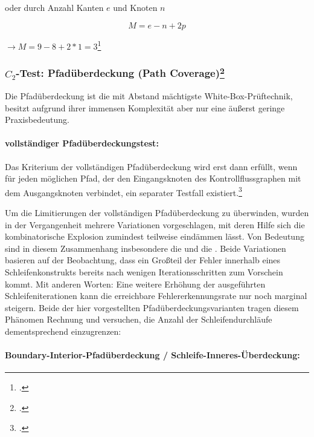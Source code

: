 \documentclass{lehramt-informatik}
\begin{document}
\noindent
oder durch Anzahl Kanten $e$ und Knoten $n$

\begin{displaymath}
M = e - n + 2p
\end{displaymath}

$\rightarrow M = 9 - 8 + 2 *1 = 3$\footcite[Kapitel 4.4.6
McCabe-Überdeckung, Seite 216220]{hoffmann}

%

\subsubsection{$C_2$-Test: Pfadüberdeckung (Path Coverage)\footcite[Seite 39]{sosy:fs:5}}

Die Pfadüberdeckung ist die mit Abstand mächtigste
White-Box-Prüftechnik, besitzt aufgrund ihrer immensen Komplexität
aber nur eine äußerst geringe Praxisbedeutung.

\paragraph{vollständiger Pfadüberdeckungstest:}

Das Kriterium der vollständigen Pfadüberdeckung wird erst dann erfüllt,
wenn für jeden möglichen Pfad, der den Eingangsknoten des
Kontrollflussgraphen mit dem Ausgangsknoten verbindet, ein separater
Testfall existiert.\footcite[Seite 210]{hoffmann}

Um die Limitierungen der vollständigen Pfadüberdeckung zu überwinden,
wurden in der Vergangenheit mehrere Variationen vorgeschlagen, mit deren
Hilfe sich die kombinatorische Explosion zumindest teilweise eindämmen
lässt. Von Bedeutung sind in diesem Zusammenhang insbesondere die
 und die . Beide Variationen basieren auf der Beobachtung, dass
ein Großteil der Fehler innerhalb eines Schleifenkonstrukts bereits nach
wenigen Iterationsschritten zum Vorschein kommt. Mit anderen Worten:
Eine weitere Erhöhung der ausgeführten Schleifeniterationen kann die
erreichbare Fehlererkennungsrate nur noch marginal steigern. Beide der
hier vorgestellten Pfadüberdeckungsvarianten tragen diesem Phänomen
Rechnung und versuchen, die Anzahl der Schleifendurchläufe
dementsprechend einzugrenzen:

\paragraph{Boundary-Interior-Pfadüberdeckung / Schleife-Inneres-Überdeckung:}
\end{document}
